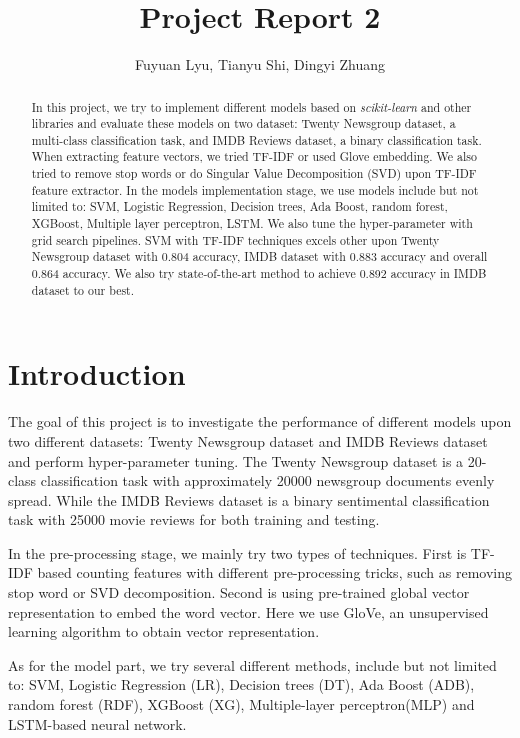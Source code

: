 \documentclass[11pt]{scrartcl}
\title{Project Report 2}
\author{Fuyuan Lyu, Tianyu Shi, Dingyi Zhuang}
\begin{document}
\maketitle

\begin{abstract}
In this project, we try to implement different models based on \textit{scikit-learn} and other libraries and evaluate these models on two dataset: Twenty Newsgroup dataset, a multi-class classification task, and IMDB Reviews dataset, a binary classification task. When extracting feature vectors, we tried TF-IDF or used Glove embedding. We also tried to remove stop words or do Singular Value Decomposition (SVD) upon TF-IDF feature extractor. In the models implementation stage, we use models include but not limited to: SVM, Logistic Regression, Decision trees, Ada Boost, random forest, XGBoost, Multiple layer perceptron, LSTM. We also tune the hyper-parameter with grid search pipelines. SVM with TF-IDF techniques excels other upon Twenty Newsgroup dataset with 0.804 accuracy, IMDB dataset with 0.883 accuracy and overall 0.864 accuracy. We also try state-of-the-art method to achieve 0.892 accuracy in IMDB dataset to our best.
\end{abstract}

\section{Introduction}
The goal of this project is to investigate the performance of different models upon two different datasets: Twenty Newsgroup dataset and IMDB Reviews dataset and perform hyper-parameter tuning. The Twenty Newsgroup dataset is a 20-class classification task with approximately 20000 newsgroup documents evenly spread\cite{Lang95}. While the IMDB Reviews dataset is a binary sentimental classification task with 25000 movie reviews for both training and testing\cite{maas-EtAl:2011:ACL-HLT2011}.

In the pre-processing stage, we mainly try two types of techniques. First is TF-IDF based counting features with different pre-processing tricks, such as removing stop word or SVD decomposition. Second is using pre-trained global vector representation to embed the word vector. Here we use GloVe, an unsupervised learning algorithm to obtain vector representation\cite{pennington2014glove}.

As for the model part, we try several different methods, include but not limited to: SVM, Logistic Regression (LR), Decision trees (DT), Ada Boost (ADB), random forest (RDF), XGBoost (XG), Multiple-layer perceptron(MLP) and LSTM-based neural network.
\end{document}
